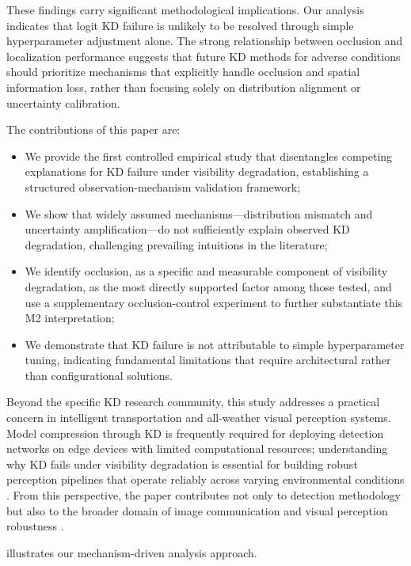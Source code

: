 These findings carry significant methodological implications. Our analysis indicates that logit KD failure is unlikely to be resolved through simple hyperparameter adjustment alone. The strong relationship between occlusion and localization performance suggests that future KD methods for adverse conditions should prioritize mechanisms that explicitly handle occlusion and spatial information loss, rather than focusing solely on distribution alignment or uncertainty calibration.

The contributions of this paper are:
\begin{itemize}
    \item We provide the first controlled empirical study that disentangles competing explanations for KD failure under visibility degradation, establishing a structured observation-mechanism validation framework;
    \item We show that widely assumed mechanisms---distribution mismatch and uncertainty amplification---do not sufficiently explain observed KD degradation, challenging prevailing intuitions in the literature;
    \item We identify occlusion, as a specific and measurable component of visibility degradation, as the most directly supported factor among those tested, and use a supplementary occlusion-control experiment to further substantiate this M2 interpretation;
    \item We demonstrate that KD failure is not attributable to simple hyperparameter tuning, indicating fundamental limitations that require architectural rather than configurational solutions.
\end{itemize}

Beyond the specific KD research community, this study addresses a practical concern in intelligent transportation and all-weather visual perception systems. Model compression through KD is frequently required for deploying detection networks on edge devices with limited computational resources; understanding why KD fails under visibility degradation is essential for building robust perception pipelines that operate reliably across varying environmental conditions \cite{chen2023towards, wang2024robust}. From this perspective, the paper contributes not only to detection methodology but also to the broader domain of image communication and visual perception robustness \cite{guo2021meets, liu2023learning}.

 illustrates our mechanism-driven analysis approach.


